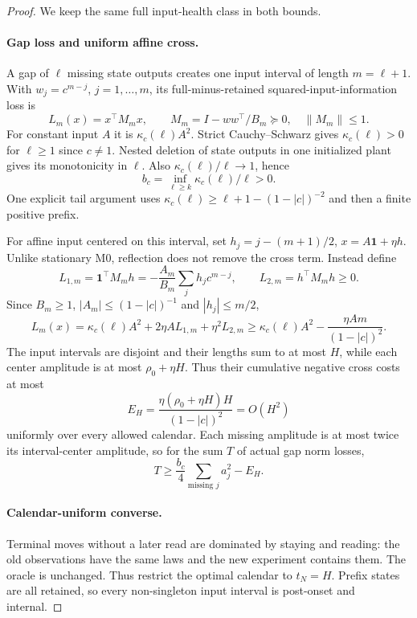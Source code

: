 \documentclass[11pt]{article}
\begin{document}
\begin{proof}
We keep the same full input-health class in both bounds.

\paragraph{Gap loss and uniform affine cross.}
A gap of $\ell$ missing state outputs creates one input interval
of length $m=\ell+1$. With $w_j=c^{m-j}$, $j=1,\ldots,m$, its full-minus-retained
squared-input-information loss is
\[
L_m(x)=x^\top M_mx,\qquad M_m=I-ww^\top/B_m\succeq0,\quad \|M_m\|\le1.
\]
For constant input $A$ it is $\kappa_c(\ell)A^2$.
Strict Cauchy--Schwarz gives $\kappa_c(\ell)>0$ for $\ell\ge1$ since $c\ne1$.
Nested deletion of state outputs in one initialized plant gives its
monotonicity in $\ell$. Also $\kappa_c(\ell)/\ell\to1$, hence
\[
b_c=\inf_{\ell\ge k}\kappa_c(\ell)/\ell>0.
\]
One explicit tail argument uses
$\kappa_c(\ell)\ge\ell+1-(1-|c|)^{-2}$ and then a finite positive prefix.

For affine input centered on this interval, set
$h_j=j-(m+1)/2$, $x=A\mathbf1+\eta h$. Unlike stationary M0, reflection does
not remove the cross term. Instead define
\[
L_{1,m}=\mathbf1^\top M_mh
=-\frac{A_m}{B_m}\sum_jh_jc^{m-j},\qquad L_{2,m}=h^\top M_mh\ge0.
\]
Since $B_m\ge1$, $|A_m|\le(1-|c|)^{-1}$ and $|h_j|\le m/2$,
\begin{equation}\label{eq:cross}
L_m(x)=\kappa_c(\ell)A^2+2\eta A L_{1,m}+\eta^2L_{2,m}
\ge\kappa_c(\ell)A^2-\frac{\eta A m}{(1-|c|)^2}.
\end{equation}
The input intervals are disjoint and their lengths sum to at most $H$,
while each center amplitude is at most $\rho_0+\eta H$. Thus their cumulative
negative cross costs at most
\begin{equation}\label{eq:error}
E_H=\frac{\eta(\rho_0+\eta H)H}{(1-|c|)^2}=O(H^2)
\end{equation}
uniformly over every allowed calendar.
Each missing amplitude is at most twice its interval-center amplitude, so
for the sum $T$ of actual gap norm losses,
\begin{equation}\label{eq:dead}
T\ge\frac{b_c}{4}\sum_{\text{missing }j}a_j^2-E_H.
\end{equation}

\paragraph{Calendar-uniform converse.}
Terminal moves without a later read are dominated by staying and reading:
the old observations have the same laws and the new experiment contains them.
The oracle is unchanged. Thus restrict the optimal calendar to $t_N=H$.
Prefix states are all retained, so every non-singleton input interval is
post-onset and internal.


\end{proof}
\end{document}
